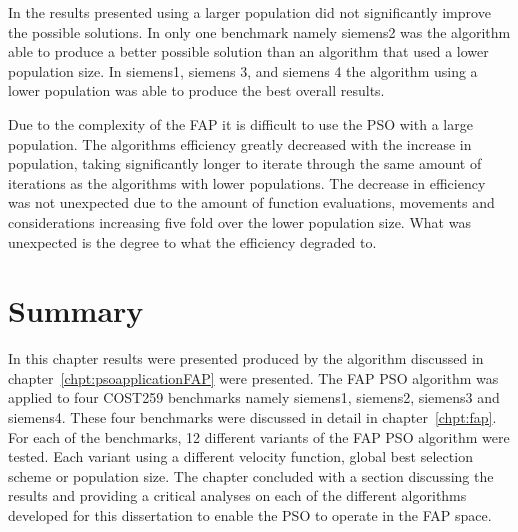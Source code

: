 In the results presented using a larger population did not significantly improve the possible solutions. In only one benchmark namely siemens2 was the algorithm able to produce a better possible solution than an algorithm that used a lower population size. In siemens1, siemens 3, and siemens 4 the algorithm using a lower population was able to produce the best overall results.

Due to the complexity of the FAP it is difficult to use the PSO with a large population. The algorithms efficiency greatly decreased with the increase in population, taking significantly longer to iterate through the same amount of iterations as the algorithms with lower populations. The decrease in efficiency was not unexpected due to the amount of function evaluations, movements and considerations increasing five fold over the lower population size. What was unexpected is the degree to what the efficiency degraded to.
\section{Summary}
In this chapter results were presented produced by the algorithm discussed in chapter~\ref{chpt:psoapplicationFAP} were presented. The FAP PSO algorithm was applied to four COST259 benchmarks namely siemens1, siemens2, siemens3 and siemens4. These four benchmarks were discussed in detail in chapter~\ref{chpt:fap}. For each of the benchmarks, 12 different variants of the FAP PSO algorithm were tested. Each variant using a different velocity function, global best selection scheme or population size. The chapter concluded with a section discussing the results and providing a critical analyses on each of the different algorithms developed for this dissertation to enable the PSO to operate in the FAP space.

